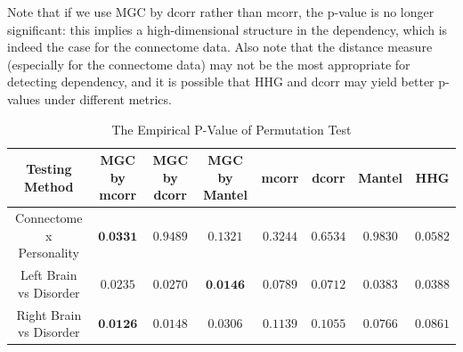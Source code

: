 \documentclass[11pt]{article}
\newcommand{\jv}[1]{{\color{red}{#1}}}
\begin{document}
Note that if we use MGC by dcorr rather than mcorr, the p-value is no longer significant: this implies a high-dimensional structure in the dependency, which is indeed the case for the connectome data. Also note that the distance measure (especially for the connectome data) may not be the most appropriate for detecting dependency, and it is possible that HHG and dcorr may yield better p-values under different metrics.

\begin{table}[!t]
\footnotesize
\renewcommand{\arraystretch}{0.5}
\centering
{\begin{tabular}{|c||c|c|c|c|c|c|c|}
\hline
Testing Method & MGC by mcorr & MGC by dcorr & MGC by Mantel & mcorr & dcorr & Mantel & HHG \\
\hline
Connectome x Personality & $\textbf{0.0331}$ & $0.9489$  & $0.1321$ & $0.3244$ & $0.6534$ & $0.9830$  & $0.0582$ \\
\hline
Left Brain vs Disorder  & $0.0235$ & $0.0270$ & $\textbf{0.0146}$ & $0.0789$ & $0.0712$ & $0.0383$ & $0.0388$ \\
\hline
Right Brain vs Disorder & $\textbf{0.0126}$ & $0.0148$  & $0.0306$ & $0.1139$ & $0.1055$  & $0.0766$ & $0.0861$\\
\hline
\end{tabular}
\caption{The Empirical P-Value of Permutation Test}
\label{table1}
}
\end{table}

\jv{i think we shold remove MGC by dcorr and by Mantel from this table, we can just mention in the text that  local variants are better than all non-local variants, including for local dcorr and local mantel?}
\end{document}
